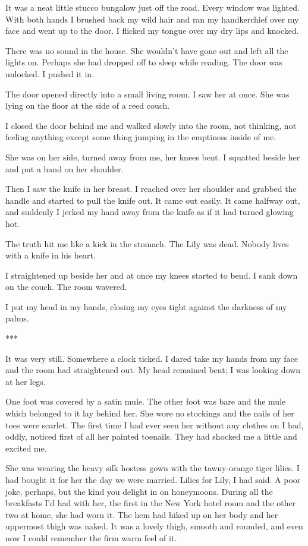 \documentclass{novel}
\begin{document}
{It was a neat little stucco bungalow just off the road. Every window was lighted. With both hands I brushed back my wild hair and ran my handkerchief over my face and went up to the door. I flicked my tongue over my dry lips and knocked.

There was no sound in the house. She wouldn’t have gone out and left all the lights on. Perhaps she had dropped off to sleep while reading. The door was unlocked. I pushed it in.

The door opened directly into a small living room. I saw her at once. She was lying on the floor at the side of a reed couch.

I closed the door behind me and walked slowly into the room, not thinking, not feeling anything except some thing jumping in the emptiness inside of me.

She was on her side, turned away from me, her knees bent. I squatted beside her and put a hand on her shoulder.

Then I saw the knife in her breast. I reached over her shoulder and grabbed the handle and started to pull the knife out. It came out easily. It came halfway out, and suddenly I jerked my hand away from the knife as if it had turned glowing hot.

The truth hit me like a kick in the stomach. The Lily was dead. Nobody lives with a knife in his heart.

I straightened up beside her and at once my knees started to bend. I sank down on the couch. The room wavered.

I put my head in my hands, closing my eyes tight against the darkness of my palms.

***

It was very still. Somewhere a clock ticked. I dared take my hands from my face and the room had straightened out. My head remained bent; I was looking down at her legs.

One foot was covered by a satin mule. The other foot was bare and the mule which belonged to it lay behind her. She wore no stockings and the nails of her toes were scarlet. The first time I had ever seen her without any clothes on I had, oddly, noticed first of all her painted toenails. They had shocked me a little and excited me.

She was wearing the heavy silk hostess gown with the tawny-orange tiger lilies. I had bought it for her the day we were married. Lilies for Lily, I had said. A poor joke, perhaps, but the kind you delight in on honeymoons. During all the breakfasts I’d had with her, the first in the New York hotel room and the other two at home, she had worn it. The hem had hiked up on her body and her uppermost thigh was naked. It was a lovely thigh, smooth and rounded, and even now I could remember the firm warm feel of it.

}
\end{document}
